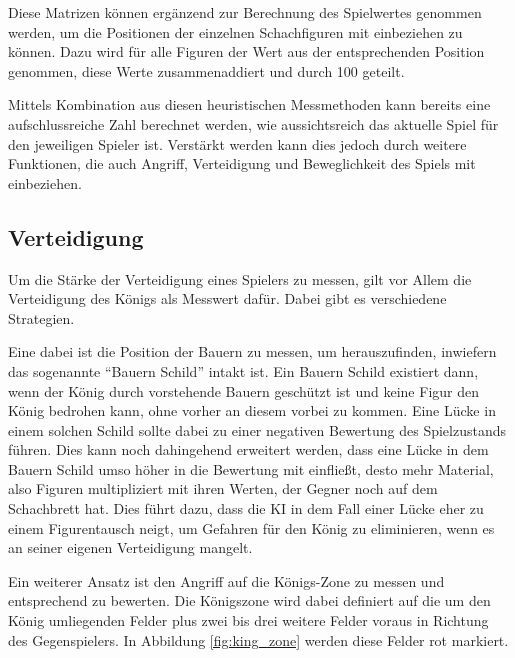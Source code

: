 Diese Matrizen können ergänzend zur Berechnung des Spielwertes genommen werden, um die Positionen der einzelnen Schachfiguren mit einbeziehen zu können. Dazu wird für alle Figuren der Wert aus der entsprechenden Position genommen, diese Werte zusammenaddiert und durch 100 geteilt.

Mittels Kombination aus diesen heuristischen Messmethoden kann bereits eine aufschlussreiche Zahl berechnet werden, wie aussichtsreich das aktuelle Spiel für den jeweiligen Spieler ist. Verstärkt werden kann dies jedoch durch weitere Funktionen, die auch Angriff, Verteidigung und Beweglichkeit des Spiels mit einbeziehen.


\subsection{Verteidigung}\label{defense_evaluation}

Um die Stärke der Verteidigung eines Spielers zu messen, gilt vor Allem die Verteidigung des Königs als Messwert dafür. Dabei gibt es verschiedene Strategien.

Eine dabei ist die Position der Bauern zu messen, um herauszufinden, inwiefern das sogenannte ``Bauern Schild'' intakt ist. Ein Bauern Schild existiert dann, wenn der König durch vorstehende Bauern geschützt ist und keine Figur den König bedrohen kann, ohne vorher an diesem vorbei zu kommen. Eine Lücke in einem solchen Schild sollte dabei zu einer negativen Bewertung des Spielzustands führen. Dies kann noch dahingehend erweitert werden, dass eine Lücke in dem Bauern Schild umso höher in die Bewertung mit einfließt, desto mehr Material, also Figuren multipliziert mit ihren Werten, der Gegner noch auf dem Schachbrett hat. Dies führt dazu, dass die KI in dem Fall einer Lücke eher zu einem Figurentausch neigt, um Gefahren für den König zu eliminieren, wenn es an seiner eigenen Verteidigung mangelt. \cite{O.V.2019b}

Ein weiterer Ansatz ist den Angriff auf die Königs-Zone zu messen und entsprechend zu bewerten. Die Königszone wird dabei definiert auf die um den König umliegenden Felder plus zwei bis drei weitere Felder voraus in Richtung des Gegenspielers. In Abbildung \ref{fig:king_zone} werden diese Felder rot markiert.

